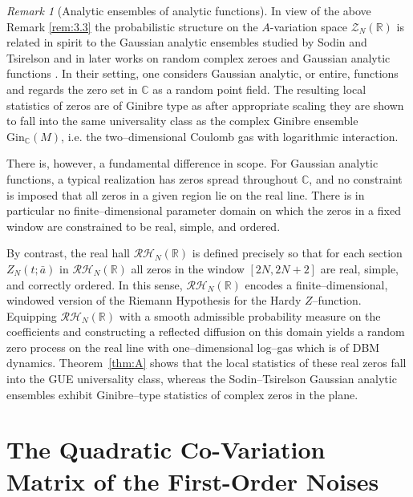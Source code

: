 \documentclass[12pt,reqno]{amsart}
\theoremstyle{plain}
\theoremstyle{definition}
\theoremstyle{remark}
\newtheorem{rem}{Remark}[section]       %
\begin{document}
\begin{rem}[Analytic ensembles of analytic functions]
In view of the above Remark \ref{rem:3.3} the probabilistic structure on the $A$-variation space $\mathcal{Z}_N(\mathbb{R})$ is related in spirit
to the Gaussian analytic ensembles studied by Sodin and Tsirelson and in later
works on random complex zeroes and Gaussian analytic functions
\cite{HKPV,NazarovSodin,SodinTsirelsonI,SodinTsirelsonII}. In their setting,
one considers Gaussian analytic, or entire, functions and regards the zero set
in $\mathbb{C}$ as a random point field. The resulting local statistics of
zeros are of Ginibre type as after appropriate scaling they are shown to fall into the
same universality class as the complex Ginibre ensemble $\mathrm{Gin}_\mathbb{C}(M)$, i.e. the two–dimensional Coulomb gas with logarithmic interaction.

There is, however, a fundamental difference in scope. For Gaussian analytic
functions, a typical realization has zeros spread throughout $\mathbb{C}$, and
no constraint is imposed that all zeros in a given region lie on the real line.
There is in particular no finite–dimensional parameter domain on which the
zeros in a fixed window are constrained to be real, simple, and ordered.

By contrast, the real hall $\mathcal{RH}_N(\mathbb{R})$ is defined precisely so
that for each section $Z_N(t;\bar a)$ in $\mathcal{RH}_N(\mathbb{R})$ all zeros in
the window $[2N,2N+2]$ are real, simple, and correctly ordered. In this sense,
$\mathcal{RH}_N(\mathbb{R})$ encodes a finite–dimensional, windowed version of
the Riemann Hypothesis for the Hardy $Z$--function. Equipping
$\mathcal{RH}_N(\mathbb{R})$ with a smooth admissible probability measure on the
coefficients and constructing a reflected diffusion on this domain yields a
random zero process on the real line with one–dimensional log–gas which is of DBM dynamics. Theorem~\ref{thm:A} shows that the local statistics
of these real zeros fall into the GUE universality class, whereas the Sodin--Tsirelson
Gaussian analytic ensembles exhibit Ginibre--type statistics of complex zeros in the plane.
\end{rem}


\section{The Quadratic Co-Variation Matrix of the First-Order Noises}
\label{s:5}
\end{document}

